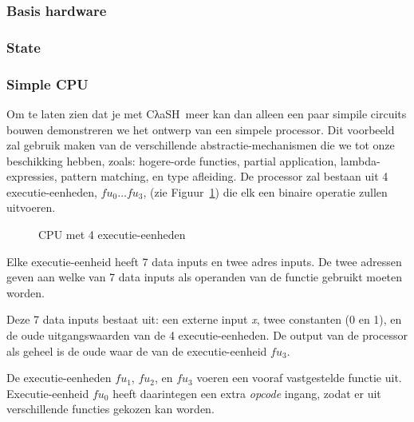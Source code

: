 \documentclass{paper}
\newcommand{\clash}{CλaSH}
\begin{document}
\subsubsection*{Basis hardware} %
\label{ssub:basis_hardware}


\subsubsection*{State} %
\label{ssub:state}


\subsubsection*{Simple CPU} %
\label{ssub:simple_cpu}
Om te laten zien dat je met \clash\ meer kan dan alleen een paar simpile circuits bouwen demonstreren we het ontwerp van een simpele processor.
Dit voorbeeld zal gebruik maken van de verschillende abstractie-mechanismen die we tot onze beschikking hebben, zoals: hogere-orde functies, partial application, lambda-expressies, pattern matching, en type afleiding.
De processor zal bestaan uit 4 executie-eenheden, $fu_{0}\ldots{}fu_{3}$, (zie Figuur~\ref{img:highordcpu}) die elk een binaire operatie zullen uitvoeren.

\begin{figure}
\caption{CPU met 4 executie-eenheden}
\label{img:highordcpu}
\end{figure}

Elke executie-eenheid heeft 7 data inputs en twee adres inputs. De twee adressen geven aan welke van 7 data inputs als operanden van de functie gebruikt moeten worden.

Deze 7 data inputs bestaat uit: een externe input \emph{x}, twee constanten (0 en 1), en de oude uitgangswaarden van de 4 executie-eenheden. De output van de processor als geheel is de oude waar de van de executie-eenheid $fu_{3}$.

De executie-eenheden $fu_{1}$, $fu_{2}$, en $fu_{3}$ voeren een vooraf vastgestelde functie uit. Executie-eenheid $fu_{0}$ heeft daarintegen een extra \emph{opcode} ingang, zodat er uit verschillende functies gekozen kan worden.
\end{document}
